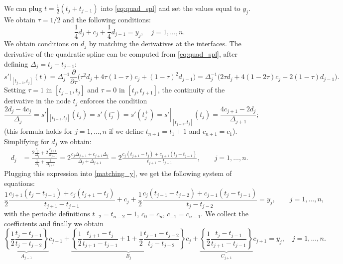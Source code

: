 \begin{problem}
\begin{subproblem}[3]
\begin{solution}
We can plug $t = \frac{1}{2}(t_j + t_{j-1})$ into \eqref{eq:quad_spl}
and set the values equal to $y_j$. We obtain $\tau=1/2$ and the following conditions:
\begin{equation}\label{matching_y}
 \frac{1}{4} d_j + c_j + \frac{1}{4} d_{j-1} = y_j,\quad j=1,...,n.
\end{equation}
We obtain conditions on $d_j$ by matching the derivatives at the interfaces.
The derivative of the quadratic spline can be computed from \eqref{eq:quad_spl}, after defining $\Delta_j=t_j-t_{j-1}$:
$$s'|_{[t_{j-1},t_{j}]}(t)=\Delta_j^{-1}\frac{\partial}{\partial \tau}\Big( \tau^{2}d_{j} + 4\tau(1-\tau)c_{j} + (1-\tau)^{2}d_{j-1}\Big)
=\Delta_j^{-1}\Big(2\tau d_j+4(1-2\tau)c_j-2(1-\tau)d_{j-1}\Big).$$
Setting $\tau=1$ in $[t_{j-1},t_j]$ and  $\tau=0$ in $[t_j,t_{j+1}]$,
the continuity of the derivative in the node $t_j$ enforces the condition
$$\frac{2d_j-4c_j}{\Delta_j}
= s'|_{[t_{j-1},t_{j}]}(t_j)
= s'(t_j^-) = s'(t_j^+)
= s'|_{[t_{j-1},t_{j}]}(t_j)
= \frac{4c_{j+1}-2d_j}{\Delta_{j+1}}; $$
(this formula holds for $j=1,\ldots,n$ if we define $t_{n+1}=t_1+1$ and $c_{n+1}=c_1$).
Simplifying for $d_j$ we obtain:
\begin{align*}
d_j & = \frac{2\frac{c_j}{\Delta_j}+2\frac{c_{j+1}}{\Delta_{j+1}}}{\frac1{\Delta_j}+\frac1{\Delta_{j+1}}}
      = 2\frac{c_j\Delta_{j+1}+c_{j+1}\Delta_j}{\Delta_j+\Delta_{j+1}}
      = 2\frac{c_j(t_{j+1}-t_j)+c_{j+1}(t_j-t_{j-1})}{t_{j+1}-t_{j-1}},\qquad j=1,\ldots,n.
\end{align*}
Plugging this expression into \eqref{matching_y}, we get the following system of equations:
\begin{equation}\label{sys_eq_c_full}
\frac{1}{2}\frac{c_{j+1}(t_{j}-t_{j-1}) + c_j(t_{j+1}-t_j)}{t_{j+1}-t_{j-1}}
+ c_j + \frac{1}{2}\frac{c_{j}(t_{j-1}-t_{j-2}) + c_{j-1}(t_{j}-t_{j-1})}{t_{j}-t_{j-2}} = y_j,\qquad j=1,\ldots,n,
\end{equation}
with the periodic definitions $t_{-2} = t_{n-2}-1$, $c_0 = c_n$, $c_{-1} = c_{n-1}$.
We collect the coefficients and finally we obtain
\begin{equation}\label{simplif_eq_c}
\underbrace{\left\{\frac{1}{2} \frac{t_j-t_{j-1}}{t_j-t_{j-2}}\right\}}_{A_{j-1}} c_{j-1} +
\underbrace{\left\{\frac{1}{2} \frac{t_{j+1}-t_{j}}{t_{j+1}-t_{j-1}} + 1
  + \frac{1}{2} \frac{t_{j-1}-t_{j-2}}{t_{j}-t_{j-2}}\right\}}_{B_{j}} c_{j}
+ \underbrace{\left\{\frac{1}{2} \frac{t_j-t_{j-1}}{t_{j+1}-t_{j-1}}\right\}}_{C_{j+1}} c_{j+1} = y_j,\quad j=1,\ldots,n.

\end{equation}
\end{solution}
\end{subproblem}
\end{problem}
